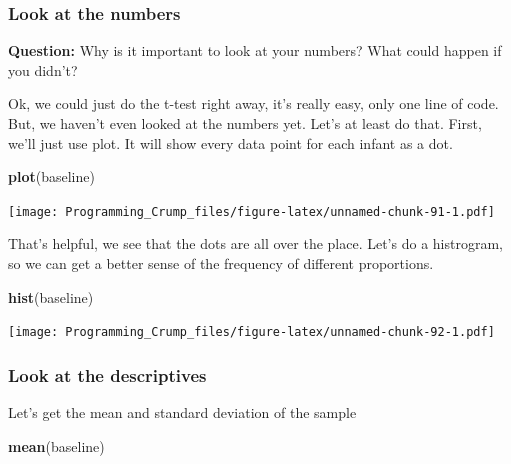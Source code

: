\documentclass[]{book}
\newenvironment{Shaded}{\begin{snugshade}}{\end{snugshade}}
\newcommand{\KeywordTok}[1]{\textcolor[rgb]{0.13,0.29,0.53}{\textbf{{#1}}}}
\newcommand{\StringTok}[1]{\textcolor[rgb]{0.31,0.60,0.02}{{#1}}}
\newcommand{\NormalTok}[1]{{#1}}
\theoremstyle{definition}
\theoremstyle{definition}
\theoremstyle{definition}
\theoremstyle{remark}
\begin{document}
\begin{Shaded}
\end{Shaded}

\subsubsection{Look at the numbers}\label{look-at-the-numbers}

\textbf{Question:} Why is it important to look at your numbers? What
could happen if you didn't?

Ok, we could just do the t-test right away, it's really easy, only one
line of code. But, we haven't even looked at the numbers yet. Let's at
least do that. First, we'll just use plot. It will show every data point
for each infant as a dot.

\begin{Shaded}
\begin{Highlighting}[]
\KeywordTok{plot}\NormalTok{(baseline)}
\end{Highlighting}
\end{Shaded}

\texttt{[image: Programming\_Crump\_files/figure-latex/unnamed-chunk-91-1.pdf]}

That's helpful, we see that the dots are all over the place. Let's do a
histrogram, so we can get a better sense of the frequency of different
proportions.

\begin{Shaded}
\begin{Highlighting}[]
\KeywordTok{hist}\NormalTok{(baseline)}
\end{Highlighting}
\end{Shaded}

\texttt{[image: Programming\_Crump\_files/figure-latex/unnamed-chunk-92-1.pdf]}

\subsubsection{Look at the descriptives}\label{look-at-the-descriptives}

Let's get the mean and standard deviation of the sample

\begin{Shaded}
\begin{Highlighting}[]
\KeywordTok{mean}\NormalTok{(baseline)}
\end{Highlighting}
\end{Shaded}
\end{document}
